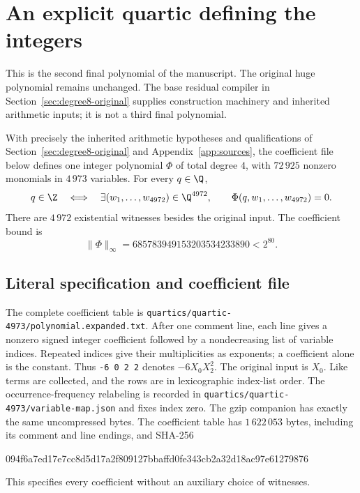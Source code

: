 \section{An explicit quartic defining the integers}
\label{sec:quartics}
This is the second final polynomial of the manuscript. The original huge
polynomial remains unchanged. The base residual compiler in
Section~\ref{sec:degree8-original} supplies construction machinery and
inherited arithmetic inputs; it is not a third final polynomial.

\begin{theorem}\label{thm:quartic}
With precisely the inherited arithmetic hypotheses and qualifications of
Section~\ref{sec:degree8-original} and Appendix~\ref{app:sources}, the
coefficient file below defines one integer polynomial $\Phi$ of total
degree $4$, with $72\,925$ nonzero monomials in $4\,973$ variables.
For every $q\in\Q$,
\[
 q\in\Z\quad\Longleftrightarrow\quad
 \exists(w_1,\ldots,w_{4972})\in\Q^{4972},\qquad
 \Phi(q,w_1,\ldots,w_{4972})=0.
\]
There are $4\,972$ existential witnesses besides the original input.
The coefficient bound is
\[
 \|\Phi\|_\infty=685783949153203534233890<2^{80}.
\]
\end{theorem}

\subsection{Literal specification and coefficient file}
The complete coefficient table is \nolinkurl{quartics/quartic-4973/polynomial.expanded.txt}.
After one comment line, each line gives a nonzero signed integer coefficient
followed by a nondecreasing list of variable indices. Repeated indices give
their multiplicities as exponents; a coefficient alone is the constant.
Thus \texttt{-6 0 2 2} denotes $-6X_0X_2^2$. The original input is $X_0$.
Like terms are collected, and the rows are in lexicographic index-list order.
The occurrence-frequency relabeling is recorded in
\nolinkurl{quartics/quartic-4973/variable-map.json} and fixes index zero.
The gzip companion has exactly the same uncompressed bytes.
The coefficient table has $1\,622\,053$ bytes, including
its comment and line endings, and SHA-256
\begin{center}\footnotesize\ttfamily
094f6a7ed17e7cc8d5d17a2f809127bbaffd0fe343cb2a32d18ac97e61279876
\end{center}

This specifies every coefficient without an auxiliary choice of witnesses.

